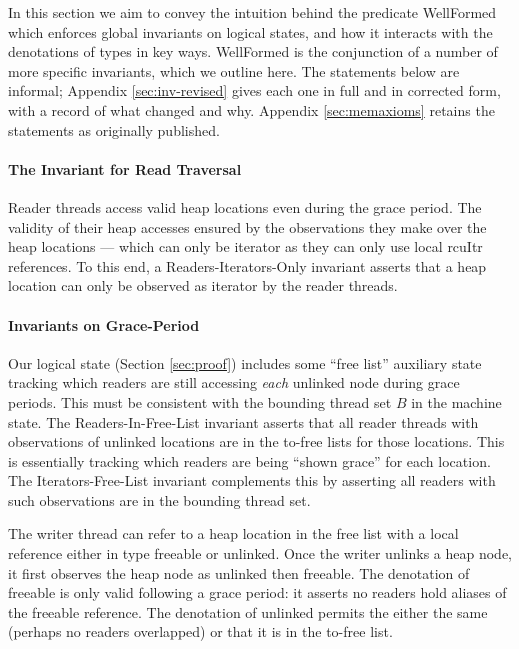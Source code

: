 \label{sec:lemmas} In this section we aim to convey the intuition behind the predicate \textsf{WellFormed} which enforces global invariants on logical states, and how it interacts with the denotations of types in key ways.
\textsf{WellFormed} is the conjunction of a number of more specific invariants, which we outline here.
The statements below are informal; Appendix \ref{sec:inv-revised} gives each one in full and in corrected form, with a record of what changed and why.  Appendix \ref{sec:memaxioms} retains the statements as originally published.

\paragraph{The Invariant for Read Traversal} Reader threads access valid heap locations even during the grace period. The validity of their heap accesses ensured by the observations they make over the heap locations --- which can only be \textsf{iterator} as they can only use local \textsf{rcuItr} references. To this end, a \textsf{Readers-Iterators-Only} invariant asserts that a heap location can only be observed as \textsf{iterator} by the reader threads.
\paragraph{Invariants on Grace-Period}
Our logical state (Section \ref{sec:proof}) includes some ``free list'' auxiliary state tracking which readers are still accessing \emph{each} unlinked node during grace periods. This must be consistent with the bounding thread set $B$ in the machine state.
The \textsf{Readers-In-Free-List} invariant 
asserts that all reader threads with observations of unlinked locations are in the to-free lists for those locations.
This is essentially tracking which readers are being ``shown grace'' for each location.
The \textsf{Iterators-Free-List} invariant complements this by asserting all readers with such observations are in the bounding thread set.

The writer thread can refer to a heap location in the free list with a local reference either in type \textsf{freeable} or \textsf{unlinked}. Once the writer unlinks a heap node, it first observes the heap node as \textsf{unlinked} then \textsf{freeable}. The denotation of \textsf{freeable} is only valid following a grace period: it asserts no readers hold aliases of the \textsf{freeable} reference. The denotation of \textsf{unlinked} permits the either the same (perhaps no readers overlapped) 
or that it is in the to-free list.
